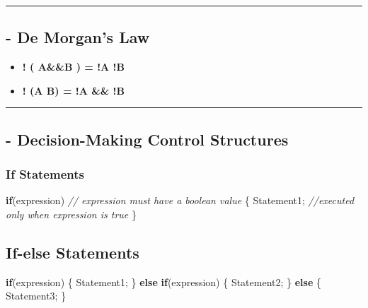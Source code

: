 \documentclass[
  paper=a4,
  ,captions=tableheading
]{scrartcl}
\newenvironment{Shaded}{}{}
\newcommand{\CommentTok}[1]{\textcolor[rgb]{0.38,0.63,0.69}{\textit{#1}}}
\newcommand{\KeywordTok}[1]{\textcolor[rgb]{0.00,0.44,0.13}{\textbf{#1}}}
\newcommand{\NormalTok}[1]{#1}
\begin{document}
\begin{center}\rule{0.5\linewidth}{\linethickness}\end{center}

\hypertarget{de-morgans-law}{%
\subsection{- De Morgan's Law}\label{de-morgans-law}}

\begin{itemize}
\item
  \textbf{! ( A\&\&B ) = !A \textbar{}\textbar{} !B}
\item
  \textbf{! (A \textbar{}\textbar{} B) = !A \&\& !B}
\end{itemize}

\begin{center}\rule{0.5\linewidth}{\linethickness}\end{center}

\hypertarget{decision-making-control-structures}{%
\subsection{- Decision-Making Control
Structures}\label{decision-making-control-structures}}

\hypertarget{if-statements}{%
\subsubsection{If Statements}\label{if-statements}}

\begin{Shaded}
\begin{Highlighting}[]
\KeywordTok{if}\NormalTok{(expression) }\CommentTok{// expression must have a boolean value}
\NormalTok{\{}
\NormalTok{    Statement1; }\CommentTok{//executed only when expression is true}
\NormalTok{\}}
\end{Highlighting}
\end{Shaded}

\hypertarget{if-else-statements}{%
\subsection{If-else Statements}\label{if-else-statements}}

\begin{Shaded}
\begin{Highlighting}[]
\KeywordTok{if}\NormalTok{(expression)}
\NormalTok{\{}
\NormalTok{    Statement1;}
\NormalTok{\}}
\KeywordTok{else} \KeywordTok{if}\NormalTok{(expression)}
\NormalTok{\{}
\NormalTok{    Statement2;}
\NormalTok{\}}
\KeywordTok{else}
\NormalTok{\{}
\NormalTok{    Statement3;}
\NormalTok{\}}
\end{Highlighting}
\end{Shaded}
\end{document}
